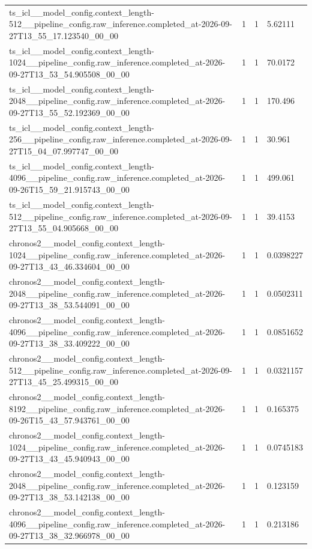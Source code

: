 \begin{tabular}{llll}
ts\_icl\_\_model\_config.context\_length-512\_\_pipeline\_config.raw\_inference.completed\_at-2026-09-27T13\_55\_17.123540\_00\_00 & 1 & 1 & 5.62111 \\
ts\_icl\_\_model\_config.context\_length-1024\_\_pipeline\_config.raw\_inference.completed\_at-2026-09-27T13\_53\_54.905508\_00\_00 & 1 & 1 & 70.0172 \\
ts\_icl\_\_model\_config.context\_length-2048\_\_pipeline\_config.raw\_inference.completed\_at-2026-09-27T13\_55\_52.192369\_00\_00 & 1 & 1 & 170.496 \\
ts\_icl\_\_model\_config.context\_length-256\_\_pipeline\_config.raw\_inference.completed\_at-2026-09-27T15\_04\_07.997747\_00\_00 & 1 & 1 & 30.961 \\
ts\_icl\_\_model\_config.context\_length-4096\_\_pipeline\_config.raw\_inference.completed\_at-2026-09-26T15\_59\_21.915743\_00\_00 & 1 & 1 & 499.061 \\
ts\_icl\_\_model\_config.context\_length-512\_\_pipeline\_config.raw\_inference.completed\_at-2026-09-27T13\_55\_04.905668\_00\_00 & 1 & 1 & 39.4153 \\
chronos2\_\_model\_config.context\_length-1024\_\_pipeline\_config.raw\_inference.completed\_at-2026-09-27T13\_43\_46.334604\_00\_00 & 1 & 1 & 0.0398227 \\
chronos2\_\_model\_config.context\_length-2048\_\_pipeline\_config.raw\_inference.completed\_at-2026-09-27T13\_38\_53.544091\_00\_00 & 1 & 1 & 0.0502311 \\
chronos2\_\_model\_config.context\_length-4096\_\_pipeline\_config.raw\_inference.completed\_at-2026-09-27T13\_38\_33.409222\_00\_00 & 1 & 1 & 0.0851652 \\
chronos2\_\_model\_config.context\_length-512\_\_pipeline\_config.raw\_inference.completed\_at-2026-09-27T13\_45\_25.499315\_00\_00 & 1 & 1 & 0.0321157 \\
chronos2\_\_model\_config.context\_length-8192\_\_pipeline\_config.raw\_inference.completed\_at-2026-09-26T15\_43\_57.943761\_00\_00 & 1 & 1 & 0.165375 \\
chronos2\_\_model\_config.context\_length-1024\_\_pipeline\_config.raw\_inference.completed\_at-2026-09-27T13\_43\_45.940943\_00\_00 & 1 & 1 & 0.0745183 \\
chronos2\_\_model\_config.context\_length-2048\_\_pipeline\_config.raw\_inference.completed\_at-2026-09-27T13\_38\_53.142138\_00\_00 & 1 & 1 & 0.123159 \\
chronos2\_\_model\_config.context\_length-4096\_\_pipeline\_config.raw\_inference.completed\_at-2026-09-27T13\_38\_32.966978\_00\_00 & 1 & 1 & 0.213186 \\

\end{tabular}
